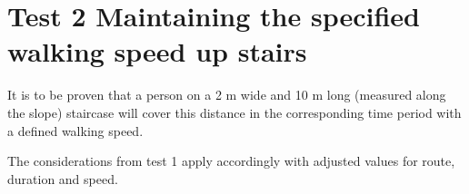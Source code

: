 \section*{Test 2 Maintaining the specified walking speed up stairs }
It is to be proven that a person on a 2 m wide and 10 m long (measured along the slope) staircase will cover this distance in the corresponding time period with a defined walking speed.

\noindent
The considerations from test 1 apply accordingly
with adjusted values for route, duration and speed.


